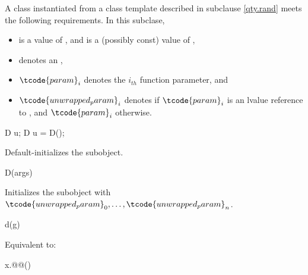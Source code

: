 \pnum
A class 
instantiated from a class template described in subclause \ref{qty.rand}
meets the following requirements.
In this subclase,
\begin{itemize}
\item
{} is a value of , and  is a (possibly const) value of ,
\item
{} denotes an ,
\item
$\tcode{param}_i$ denotes the $i_{th}$ function parameter, and
\item
$\tcode{unwrapped_param}_i$ denotes 
if $\tcode{param}_i$ is an lvalue reference to , and
$\tcode{param}_i$ otherwise.
\end{itemize}

\begin{itemdecl}
D u;
D u = D();
\end{itemdecl}

\begin{itemdescr}
\pnum
\effects
Default-initializes the  subobject.
\end{itemdescr}

\begin{itemdecl}
D(args)
\end{itemdecl}

\begin{itemdescr}
\pnum
\effects
Initializes the  subobject with
$\tcode{unwrapped_param}_0, \ldots, \tcode{unwrapped_param}_n$.
\end{itemdescr}

%
\begin{itemdecl}
d(g)
\end{itemdecl}

\begin{itemdescr}
\pnum
\effects
Equivalent to:
\end{itemdescr}

%
%
\begin{itemdecl}
x.@@()
\end{itemdecl}

